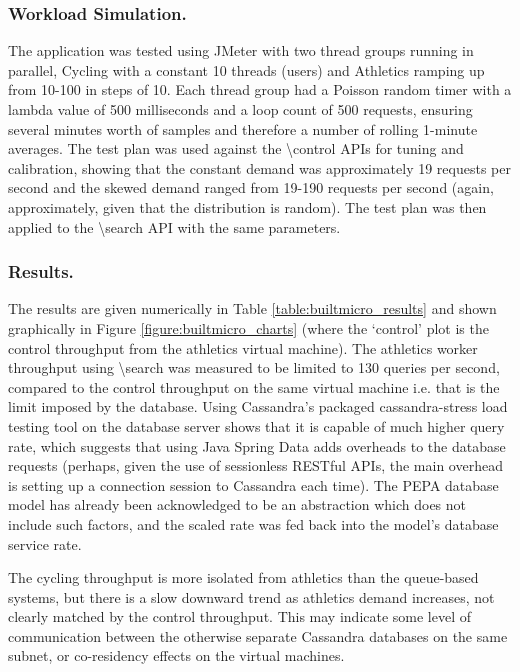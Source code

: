 \documentclass[runningheads]{llncs}
\begin{document}
\subsubsection{Workload Simulation.}  The application was tested using JMeter with two thread groups running in parallel, Cycling with a constant 10 threads (users) and Athletics ramping up from 10-100 in steps of 10.  Each thread group had a Poisson random timer with a lambda value of 500 milliseconds and a loop count of 500 requests, ensuring several minutes worth of samples and therefore a number of rolling 1-minute averages.  The test plan was used against the {\textbackslash control} APIs for tuning and calibration, showing that the constant demand was approximately 19 requests per second and the skewed demand ranged from 19-190 requests per second (again, approximately, given that the distribution is random). The test plan was then applied to the {\textbackslash search} API with the same parameters.

\subsubsection{Results.}  The results are given numerically in Table \ref{table:builtmicro_results} and shown graphically in Figure \ref{figure:builtmicro_charts} (where the `control' plot is the control throughput from the athletics virtual machine).  The athletics worker throughput using {\textbackslash search} was measured to be limited to 130 queries per second, compared to the control throughput on the same virtual machine i.e. that is the limit imposed by the database.  Using Cassandra's packaged cassandra-stress load testing tool on the database server shows that it is capable of much higher query rate, which suggests that using Java Spring Data adds overheads to the database requests (perhaps, given the use of sessionless RESTful APIs, the main overhead is setting up a connection session to Cassandra each time).  The PEPA database model has already been acknowledged to be an abstraction which does not include such factors, and the scaled rate was fed back into the model's database service rate.

The cycling throughput is more isolated from athletics than the queue-based systems, but there is a slow downward trend as athletics demand increases, not clearly matched by the control throughput.  This may indicate some level of communication between the otherwise separate Cassandra databases on the same subnet, or co-residency effects on the virtual machines.
\end{document}
